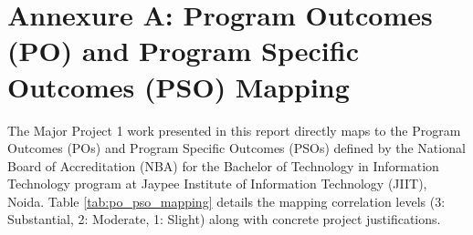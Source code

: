 \documentclass[12pt,a4paper,oneside]{report}
\begin{document}
\chapter*{Annexure A: Program Outcomes (PO) and Program Specific Outcomes (PSO) Mapping}
\label{annex:po_pso}

The Major Project 1 work presented in this report directly maps to the Program Outcomes (POs) and Program Specific Outcomes (PSOs) defined by the National Board of Accreditation (NBA) for the Bachelor of Technology in Information Technology program at Jaypee Institute of Information Technology (JIIT), Noida. Table \ref{tab:po_pso_mapping} details the mapping correlation levels (3: Substantial, 2: Moderate, 1: Slight) along with concrete project justifications.
\end{document}
